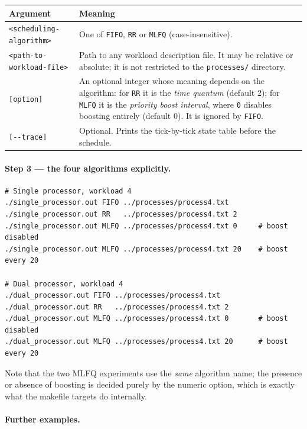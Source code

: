 \documentclass[11pt,a4paper]{article}
\begin{document}
\begin{center}
\begin{tabular}{l>{\raggedright\arraybackslash}p{10.2cm}}
\toprule
\textbf{Argument} & \textbf{Meaning} \\
\midrule
\texttt{<scheduling-algorithm>} & One of \texttt{FIFO}, \texttt{RR} or \texttt{MLFQ}
  (case-insensitive). \\
\texttt{<path-to-workload-file>} & Path to any workload description file. It may be
  relative or absolute; it is not restricted to the \texttt{processes/} directory. \\
\texttt{[option]} & An optional integer whose meaning depends on the algorithm:
  for \texttt{RR} it is the \emph{time quantum} (default 2);
  for \texttt{MLFQ} it is the \emph{priority boost interval}, where \texttt{0} disables
  boosting entirely (default 0). It is ignored by \texttt{FIFO}. \\
\texttt{[-{}-trace]} & Optional. Prints the tick-by-tick state table before the schedule. \\
\bottomrule
\end{tabular}
\end{center}

\paragraph{Step 3 --- the four algorithms explicitly.}

\begin{lstlisting}
# Single processor, workload 4
./single_processor.out FIFO ../processes/process4.txt
./single_processor.out RR   ../processes/process4.txt 2
./single_processor.out MLFQ ../processes/process4.txt 0     # boost disabled
./single_processor.out MLFQ ../processes/process4.txt 20    # boost every 20

# Dual processor, workload 4
./dual_processor.out FIFO ../processes/process4.txt
./dual_processor.out RR   ../processes/process4.txt 2
./dual_processor.out MLFQ ../processes/process4.txt 0       # boost disabled
./dual_processor.out MLFQ ../processes/process4.txt 20      # boost every 20
\end{lstlisting}

Note that the two MLFQ experiments use the \emph{same} algorithm name; the presence or
absence of boosting is decided purely by the numeric option, which is exactly what the
makefile targets do internally.

\paragraph{Further examples.}
\end{document}
